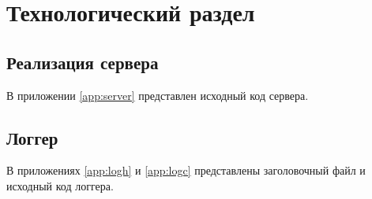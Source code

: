 \section{Технологический раздел}

\subsection{Реализация сервера}

В приложении \ref{app:server} представлен исходный код сервера.

\subsection{Логгер}

В приложениях \ref{app:logh} и \ref{app:logc} представлены заголовочный файл и исходный код логгера.

\clearpage